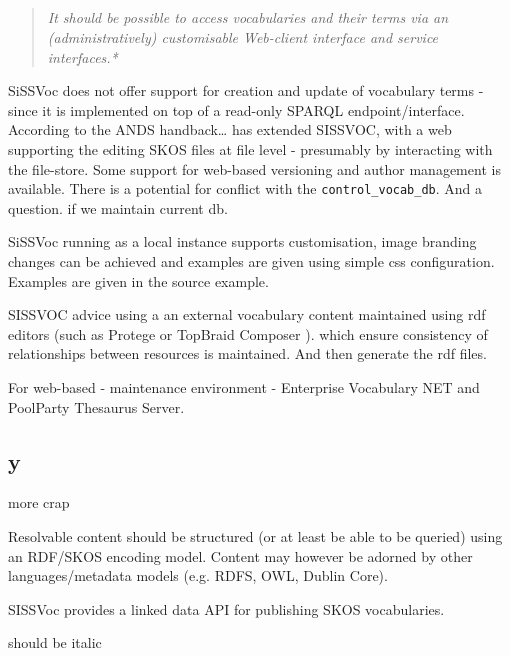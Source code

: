 \documentclass[10pt,a4paper]{article}
\newenvironment{italicquotes}
{\begin{quote}\itshape}
{\end{quote}}
\begin{document}
\begin{flushleft}
\subsection{} 
\begin{italicquotes} 
It should be possible to access vocabularies and their terms via an 
(administratively) customisable Web-client interface and service interfaces.*

\end{italicquotes} 

SiSSVoc does not offer support for creation and update of vocabulary terms - 
since it is implemented on top of a read-only SPARQL endpoint/interface.  
According to the ANDS handback… has extended SISSVOC, with a web supporting 
the editing SKOS files at file level - presumably by interacting with the 
file-store. Some support for web-based versioning and author management is 
available. There is a potential for conflict with the \texttt{control\_vocab\_db}. And a 
question. if we maintain current db.

SiSSVoc running as a local instance supports customisation, image branding 
changes can be achieved and examples are given using simple css configuration. 
Examples are given in the source example.

SISSVOC advice using a an external vocabulary content maintained using rdf 
editors (such as Protege or TopBraid Composer ). which ensure consistency of 
relationships between resources is maintained. And then generate the rdf files. 

For web-based - maintenance environment - Enterprise Vocabulary NET and 
PoolParty Thesaurus Server. 




\subsection{y}
  more crap


\begin{subsection}{Resolvable content should be structured (or at least be able to be queried)
  using an RDF/SKOS encoding model. Content may however be adorned by other
  languages/metadata models (e.g. RDFS, OWL, Dublin Core).  }

	SISSVoc provides a linked data API for publishing SKOS vocabularies.


  \begin{textit}{
    should be italic
  }
  \end{textit}


\end{subsection}





  \end{flushleft}
\end{document}
